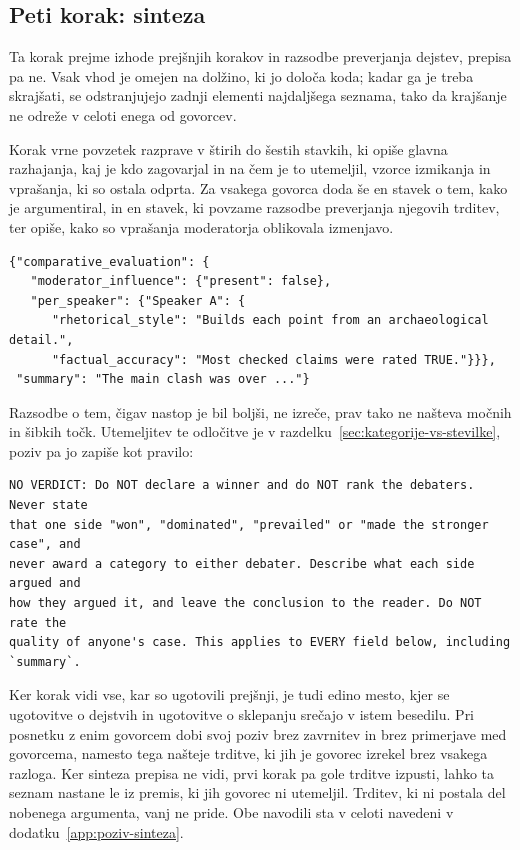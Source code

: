 \documentclass[a4paper, 12pt]{book}
\begin{document}
\subsection{Peti korak: sinteza}
\label{ssec:prehod5}

Ta korak prejme izhode prejšnjih korakov in razsodbe preverjanja dejstev,
prepisa pa ne. Vsak vhod je omejen na dolžino, ki jo določa koda; kadar ga je
treba skrajšati, se odstranjujejo zadnji elementi najdaljšega seznama, tako da
krajšanje ne odreže v celoti enega od govorcev.

Korak vrne povzetek razprave v štirih do šestih stavkih, ki opiše glavna
razhajanja, kaj je kdo zagovarjal in na čem je to utemeljil, vzorce izmikanja in
vprašanja, ki so ostala odprta. Za vsakega govorca doda še en stavek o tem,
kako je argumentiral, in en stavek, ki povzame razsodbe preverjanja njegovih
trditev, ter opiše, kako so vprašanja moderatorja oblikovala izmenjavo.

\begin{lstlisting}[basicstyle=\ttfamily\scriptsize,breaklines=true]
{"comparative_evaluation": {
   "moderator_influence": {"present": false},
   "per_speaker": {"Speaker A": {
      "rhetorical_style": "Builds each point from an archaeological detail.",
      "factual_accuracy": "Most checked claims were rated TRUE."}}},
 "summary": "The main clash was over ..."}
\end{lstlisting}

Razsodbe o tem, čigav nastop je bil boljši, ne izreče, prav tako ne našteva
močnih in šibkih točk. Utemeljitev te odločitve je v
razdelku~\ref{sec:kategorije-vs-stevilke}, poziv pa jo zapiše kot pravilo:

\begin{lstlisting}[basicstyle=\ttfamily\scriptsize,breaklines=true]
NO VERDICT: Do NOT declare a winner and do NOT rank the debaters. Never state
that one side "won", "dominated", "prevailed" or "made the stronger case", and
never award a category to either debater. Describe what each side argued and
how they argued it, and leave the conclusion to the reader. Do NOT rate the
quality of anyone's case. This applies to EVERY field below, including
`summary`.
\end{lstlisting}

Ker korak vidi vse, kar so ugotovili prejšnji, je tudi edino mesto, kjer se
ugotovitve o dejstvih in ugotovitve o sklepanju srečajo v istem besedilu. Pri
posnetku z enim govorcem dobi svoj poziv brez zavrnitev in brez primerjave med
govorcema, namesto tega našteje trditve, ki jih je govorec izrekel brez vsakega
razloga. Ker sinteza prepisa ne vidi, prvi korak pa gole trditve izpusti, lahko ta
seznam nastane le iz premis, ki jih govorec ni utemeljil. Trditev, ki ni postala
del nobenega argumenta, vanj ne pride. Obe navodili sta v celoti navedeni v dodatku~\ref{app:poziv-sinteza}.
\end{document}
